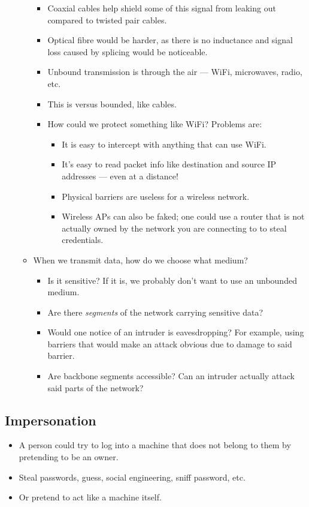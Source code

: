 \documentclass{article}
\begin{document}
\begin{itemize}
\begin{itemize}
\begin{itemize}
                    \item Coaxial cables help shield some of this signal from leaking out compared to twisted pair cables.
                    \item Optical fibre would be harder, as there is no inductance and signal loss caused by splicing would be noticeable.
                    \item Unbound transmission is through the air --- WiFi, microwaves, radio, etc.
                    \item This is versus bounded, like cables.
                    \item How could we protect something like WiFi?  Problems are:
                        \begin{itemize}
                            \item It is easy to intercept with anything that can use WiFi.
                            \item It's easy to read packet info like destination and source IP addresses --- even at a distance!
                            \item Physical barriers are useless for a wireless network.
                            \item Wireless APs can also be faked; one could use a router that is not actually owned by the network you are connecting to to steal credentials.
                        \end{itemize}
                \end{itemize}
            \item When we transmit data, how do we choose what medium?
                \begin{itemize}
                    \item Is it sensitive?  If it is, we probably don't want to use an unbounded medium.
                    \item Are there \emph{segments} of the network carrying sensitive data?
                    \item Would one notice of an intruder is eavesdropping?  For example, using barriers that would make an attack obvious due to damage to said barrier.
                    \item Are backbone segments accessible?  Can an intruder actually attack said parts of the network?
                \end{itemize}
        \end{itemize}
\end{itemize}

\subsection{Impersonation}
\begin{itemize}
    \item A person could try to log into a machine that does not belong to them by pretending to be an owner.
    \item Steal passwords, guess, social engineering, sniff password, etc.
    \item Or pretend to act like a machine itself.
\end{itemize}
\end{document}
